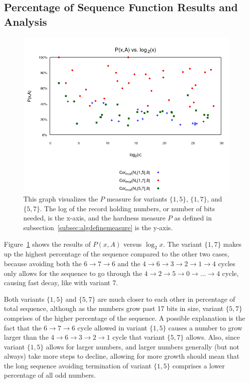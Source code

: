 \subsection{Percentage of Sequence Function Results and Analysis} \label{subsubsec:algmulpercentage}
\begin{figure}
    \centering
    \includegraphics[scale=0.6]{ModAvoidanceAnalysisPics/P_vs_log_multi_base.png}
    \caption{This graph visualizes the $P$ measure for variants $\{1,5\}$, $\{1,7\}$, and $\{5,7\}$. The log of the record holding numbers, or number of bits needed, is the x-axis, and the hardness measure $P$ as defined in subsection~\ref{subsec:algdefinemeasure} is the y-axis.}
    \label{fig:p_multi_vslog}
\end{figure}
Figure~\ref{fig:p_multi_vslog} shows the results of $P(x,A)$ versus $\log_2{x}$. The variant $\{1,7\}$ makes up the highest percentage of the sequence compared to the other two cases, because avoiding both the $6 \rightarrow 7 \rightarrow 6$ and the $4 \rightarrow 6 \rightarrow 3 \rightarrow 2 \rightarrow 1 \rightarrow 4$ cycles only allows for the sequence to go through the $4  \rightarrow 2 \rightarrow 5 \rightarrow 0 \rightarrow \ldots \rightarrow 4$ cycle, causing fast decay, like with variant 7. \par
Both variants $\{1,5\}$ and $\{5,7\}$ are much closer to each other in percentage of total sequence, although as the numbers grow past 17 bits in size, variant $\{5,7\}$ comprises of the higher percentage of the sequence. A possible explanation is the fact that the $6 \rightarrow 7 \rightarrow 6$ cycle allowed in variant $\{1,5\}$ causes a number to grow larger than the $4 \rightarrow 6 \rightarrow 3 \rightarrow 2 \rightarrow 1$ cycle that variant $\{5,7\}$ allows. Also, since variant $\{1,5\}$ allows for larger numbers, and larger numbers generally (but not always) take more steps to decline, allowing for more growth should mean that the long sequence avoiding termination of variant $\{1,5\}$ comprises a lower percentage of all odd numbers.
